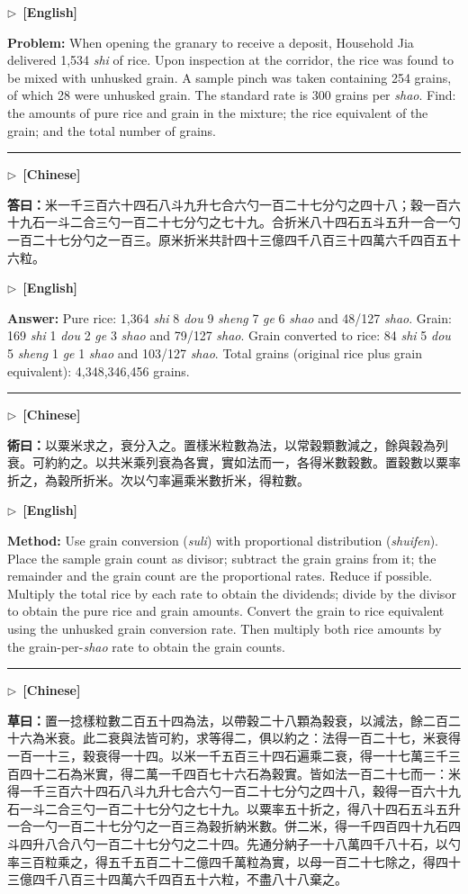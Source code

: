 \documentclass[10pt,a4paper]{article}
\newcommand{\longline}{\par\noindent\rule{\textwidth}{0.4pt}\par}
\newcommand{\CNmarker}{\noindent\textcolor{cnlabel}{$\triangleright$\ \textbf{[Chinese]}}\par}
\newcommand{\ENmarker}{\noindent\textcolor{enlabel}{$\triangleright$\ \textbf{[English]}}\par}
\newcommand{\Answer}[1]{\par\noindent\textbf{\color{answercolor}答曰：}#1\par}
\newcommand{\Method}[1]{\par\noindent\textbf{\color{methodcolor}術曰：}#1\par}
\newcommand{\Working}[1]{\par\noindent\textbf{\color{workingcolor}草曰：}#1\par}
\newcommand{\QuestionEn}[1]{\par\noindent\textbf{\color{problemcolor}Problem:} #1\par}
\newcommand{\AnswerEn}[1]{\par\noindent\textbf{\color{answercolor}Answer:} #1\par}
\newcommand{\MethodEn}[1]{\par\noindent\textbf{\color{methodcolor}Method:} #1\par}
\begin{document}
\ENmarker
\QuestionEn{When opening the granary to receive a deposit, Household Jia delivered 1,534 \textit{shi} of rice. Upon inspection at the corridor, the rice was found to be mixed with unhusked grain. A sample pinch was taken containing 254 grains, of which 28 were unhusked grain. The standard rate is 300 grains per \textit{shao}. Find: the amounts of pure rice and grain in the mixture; the rice equivalent of the grain; and the total number of grains.}

\longline

\CNmarker
\Answer{米一千三百六十四石八斗九升七合六勺一百二十七分勺之四十八；穀一百六十九石一斗二合三勺一百二十七分勺之七十九。合折米八十四石五斗五升一合一勺一百二十七分勺之一百三。原米折米共計四十三億四千八百三十四萬六千四百五十六粒。}

\ENmarker
\AnswerEn{Pure rice: 1,364 \textit{shi} 8 \textit{dou} 9 \textit{sheng} 7 \textit{ge} 6 \textit{shao} and 48/127 \textit{shao}. Grain: 169 \textit{shi} 1 \textit{dou} 2 \textit{ge} 3 \textit{shao} and 79/127 \textit{shao}. Grain converted to rice: 84 \textit{shi} 5 \textit{dou} 5 \textit{sheng} 1 \textit{ge} 1 \textit{shao} and 103/127 \textit{shao}. Total grains (original rice plus grain equivalent): 4,348,346,456 grains.}

\longline

\CNmarker
\Method{以粟米求之，衰分入之。置樣米粒數為法，以常穀顆數減之，餘與穀為列衰。可約約之。以共米乘列衰為各實，實如法而一，各得米數穀數。置穀數以粟率折之，為穀所折米。次以勺率遍乘米數折米，得粒數。}

\ENmarker
\MethodEn{Use grain conversion (\textit{suli}) with proportional distribution (\textit{shuifen}). Place the sample grain count as divisor; subtract the grain grains from it; the remainder and the grain count are the proportional rates. Reduce if possible. Multiply the total rice by each rate to obtain the dividends; divide by the divisor to obtain the pure rice and grain amounts. Convert the grain to rice equivalent using the unhusked grain conversion rate. Then multiply both rice amounts by the grain-per-\textit{shao} rate to obtain the grain counts.}

\longline

\CNmarker
\Working{置一捻樣粒數二百五十四為法，以帶穀二十八顆為穀衰，以減法，餘二百二十六為米衰。此二衰與法皆可約，求等得二，俱以約之：法得一百二十七，米衰得一百一十三，穀衰得一十四。以米一千五百三十四石遍乘二衰，得一十七萬三千三百四十二石為米實，得二萬一千四百七十六石為穀實。皆如法一百二十七而一：米得一千三百六十四石八斗九升七合六勺一百二十七分勺之四十八，穀得一百六十九石一斗二合三勺一百二十七分勺之七十九。以粟率五十折之，得八十四石五斗五升一合一勺一百二十七分勺之一百三為穀折納米數。併二米，得一千四百四十九石四斗四升八合八勺一百二十七分勺之二十四。先通分納子一十八萬四千八十石，以勺率三百粒乘之，得五千五百二十二億四千萬粒為實，以母一百二十七除之，得四十三億四千八百三十四萬六千四百五十六粒，不盡八十八棄之。}
\end{document}
